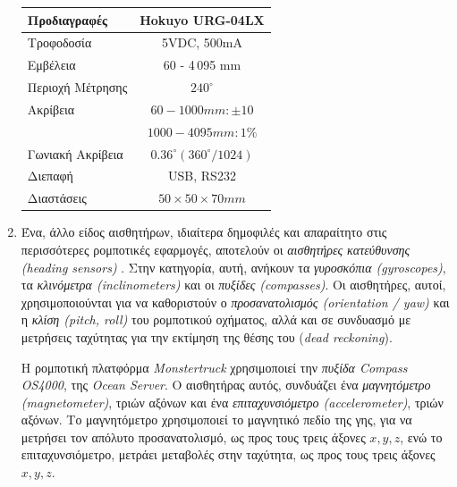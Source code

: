 \begin{enumerate}
\begin{table}[!ht]
	\centering
	\label{tab:hokuyo_specs}
	\begin{tabular}{| l | c |}
		\hline
	   \textbf{Προδιαγραφές} & \textbf{Hokuyo URG-04LX} \\ \hline
	   Τροφοδοσία & 5VDC, 500mA\\ \hline
	   Εμβέλεια & 60 - 4\,095 mm \\ \hline
	   Περιοχή Μέτρησης & $240^{\circ}$\\ \hline
	   Ακρίβεια & $60 - 1000mm: \pm 10$ \\
   		& $1000 - 4095mm: 1\%$ \\ \hline
	  	Γωνιακή Ακρίβεια & $0.36^{\circ} (360^{\circ}/1024)$ \\ \hline
	  	Διεπαφή & USB, RS232 \\ \hline
	  	Διαστάσεις & $50 \times 50 \times 70 mm$ \\ \hline
	\end{tabular}
\end{table}

\bigskip
\item
Ένα, άλλο είδος αισθητήρων, ιδιαίτερα δημοφιλές και απαραίτητο στις περισσότερες ρομποτικές εφαρμογές, αποτελούν οι \textit{αισθητήρες κατεύθυνσης (heading sensors)} \cite{autonomous_mobile_robots}. Στην κατηγορία, αυτή, ανήκουν τα \textit{γυροσκόπια (gyroscopes)}, τα \textit{κλινόμετρα (inclinometers)} και οι \textit{πυξίδες (compasses)}. Οι αισθητήρες, αυτοί, χρησιμοποιούνται για να καθοριστούν ο \textit{προσανατολισμός (orientation / yaw)} και η \textit{κλίση (pitch, roll)} του ρομποτικού οχήματος, αλλά και σε συνδυασμό με μετρήσεις ταχύτητας για την εκτίμηση της θέσης του (\textit{dead reckoning}).

Η ρομποτική πλατφόρμα \textit{Monstertruck} χρησιμοποιεί την \textit{πυξίδα Compass OS4000}, της \textit{Ocean Server}. Ο αισθητήρας αυτός, συνδυάζει ένα \textit{μαγνητόμετρο (magnetometer)}, τριών αξόνων και ένα \textit{επιταχυνσιόμετρο (accelerometer)}, τριών αξόνων. Το μαγνητόμετρο χρησιμοποιεί το μαγνητικό πεδίο της γης, για να μετρήσει τον απόλυτο προσανατολισμό, ως προς τους τρεις άξονες $x, y, z$, ενώ το επιταχυνσιόμετρο, μετράει μεταβολές στην ταχύτητα, ως προς τους τρεις άξονες $x, y, z$.


\end{enumerate}
